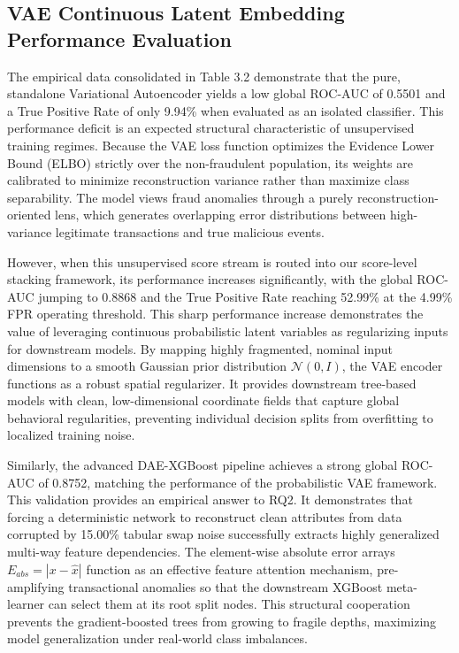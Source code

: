 \documentclass[11pt,a4paper]{report}
\begin{document}
\subsection{VAE Continuous Latent Embedding Performance Evaluation}
The empirical data consolidated in Table 3.2 demonstrate that the pure, standalone Variational Autoencoder yields a low global ROC-AUC of 0.5501 and a True Positive Rate of only 9.94\% when evaluated as an isolated classifier. This performance deficit is an expected structural characteristic of unsupervised training regimes. Because the VAE loss function optimizes the Evidence Lower Bound (ELBO) strictly over the non-fraudulent population, its weights are calibrated to minimize reconstruction variance rather than maximize class separability. The model views fraud anomalies through a purely reconstruction-oriented lens, which generates overlapping error distributions between high-variance legitimate transactions and true malicious events. 

However, when this unsupervised score stream is routed into our score-level stacking framework, its performance increases significantly, with the global ROC-AUC jumping to 0.8868 and the True Positive Rate reaching 52.99\% at the 4.99\% FPR operating threshold. This sharp performance increase demonstrates the value of leveraging continuous probabilistic latent variables as regularizing inputs for downstream models. By mapping highly fragmented, nominal input dimensions to a smooth Gaussian prior distribution $\mathcal{N}(0,I)$, the VAE encoder functions as a robust spatial regularizer. It provides downstream tree-based models with clean, low-dimensional coordinate fields that capture global behavioral regularities, preventing individual decision splits from overfitting to localized training noise. 

Similarly, the advanced DAE-XGBoost pipeline achieves a strong global ROC-AUC of 0.8752, matching the performance of the probabilistic VAE framework. This validation provides an empirical answer to RQ2. It demonstrates that forcing a deterministic network to reconstruct clean attributes from data corrupted by 15.00\% tabular swap noise successfully extracts highly generalized multi-way feature dependencies. The element-wise absolute error arrays $E_{abs}=|x-\hat{x}|$ function as an effective feature attention mechanism, pre-amplifying transactional anomalies so that the downstream XGBoost meta-learner can select them at its root split nodes. This structural cooperation prevents the gradient-boosted trees from growing to fragile depths, maximizing model generalization under real-world class imbalances.
\end{document}
